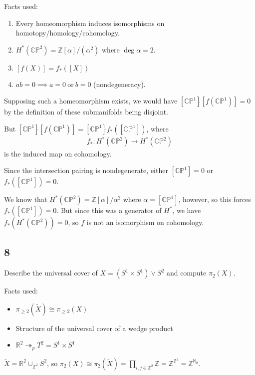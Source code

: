 \begin{solution}

Facts used:

\begin{enumerate}
\def\labelenumi{\arabic{enumi}.}
\tightlist
\item
  Every homeomorphism induces isomorphisms on
  homotopy/homology/cohomology.
\item
  \(H^*({\mathbb{CP}}^2) = {\mathbb{Z}}[\alpha] / (\alpha^2)\) where
  \(\deg \alpha = 2\).
\item
  \([f(X)] = f_*([X])\)
\item
  \(a\dot{} b = 0 \implies a=0~\text{or}~b=0\) (nondegeneracy).
\end{enumerate}

Supposing such a homeomorphism exists, we would have
\([{\mathbb{CP}}^1] \dot{} [f({\mathbb{CP}}^1)] = 0\) by the definition
of these submanifolds being disjoint.

But
\([{\mathbb{CP}}^1]\dot{}[f({\mathbb{CP}}^1)] = [{\mathbb{CP}}^1]\dot{} f_*([{\mathbb{CP}}^1])\),
where
\begin{align*}
f_*: H^*({\mathbb{CP}}^2) \to H^*({\mathbb{CP}}^2)
\end{align*}
is the induced map on cohomology.

Since the intersection pairing is nondegenerate, either
\([{\mathbb{CP}}^1] = 0\) or \(f_*([{\mathbb{CP}}^1]) = 0\).

We know that \(H^*({\mathbb{CP}}^2) = {\mathbb{Z}}[\alpha] / \alpha^2\)
where \(\alpha = [{\mathbb{CP}}^1]\), however, so this forces
\(f_*([{\mathbb{CP}}^1]) = 0\). But since this was a generator of
\(H^*\), we have \(f_*(H^*({\mathbb{CP}}^2)) = 0\), so \(f\) is not an
isomorphism on cohomology.

\end{solution}

\hypertarget{section-12}{%
\subsection{8}\label{section-12}}

Describe the universal cover of \(X = (S^1 \times S^1) \vee S^2\) and
compute \(\pi_2(X)\).

\begin{solution}

Facts used:

\begin{itemize}
\tightlist
\item
  \(\pi_{\geq 2}(\tilde X) \cong \pi_{\geq 2}(X)\)
\item
  Structure of the universal cover of a wedge product
\item
  \({\mathbb{R}}^2 \twoheadrightarrow_p T^2 = S^1 \times S^1\)
\end{itemize}

\(\tilde X = {\mathbb{R}}^2 \cup_{{\mathbb{Z}}^2} S^2\), so
\(\pi_2(X) \cong \pi_2(\tilde X) = \prod_{i,j \in {\mathbb{Z}}^2} {\mathbb{Z}}= {\mathbb{Z}}^{{\mathbb{Z}}^2} = {\mathbb{Z}}^{\aleph_0}\).

\end{solution}

